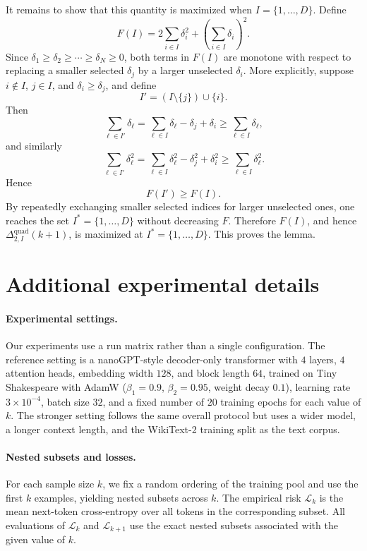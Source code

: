 \documentclass[10pt]{article}
\theoremstyle{plain}
\theoremstyle{remark}
\begin{document}
It remains to show that this quantity is maximized when $I=\{1,\dots,D\}$.
Define
\[
F(I)
=
2\sum_{i\in I}\delta_i^2
+
\left(\sum_{i\in I}\delta_i\right)^2.
\]
Since $\delta_1\ge\delta_2\ge\cdots\ge\delta_N\ge0$, both terms in $F(I)$ are monotone with respect to replacing a smaller selected $\delta_j$ by a larger unselected $\delta_i$.
More explicitly, suppose $i\notin I$, $j\in I$, and $\delta_i\ge \delta_j$, and define
\[
I'=(I\setminus\{j\})\cup\{i\}.
\]
Then
\[
\sum_{\ell\in I'}\delta_\ell
=
\sum_{\ell\in I}\delta_\ell - \delta_j + \delta_i
\ge
\sum_{\ell\in I}\delta_\ell,
\]
and similarly
\[
\sum_{\ell\in I'}\delta_\ell^2
=
\sum_{\ell\in I}\delta_\ell^2 - \delta_j^2 + \delta_i^2
\ge
\sum_{\ell\in I}\delta_\ell^2.
\]
Hence
\[
F(I')\ge F(I).
\]
By repeatedly exchanging smaller selected indices for larger unselected ones, one reaches the set $I^*=\{1,\dots,D\}$ without decreasing $F$.
Therefore $F(I)$, and hence $\Delta_{2,I}^{\mathrm{quad}}(k+1)$, is maximized at $I^*=\{1,\dots,D\}$.
This proves the lemma.

\section{Additional experimental details}
\label{app:exp}

\paragraph{Experimental settings.}
Our experiments use a run matrix rather than a single configuration.
The reference setting is a nanoGPT-style decoder-only transformer with $4$ layers, $4$ attention heads, embedding width $128$, and block length $64$, trained on Tiny Shakespeare with AdamW ($\beta_1=0.9$, $\beta_2=0.95$, weight decay $0.1$), learning rate $3\times 10^{-4}$, batch size $32$, and a fixed number of $20$ training epochs for each value of $k$.
The stronger setting follows the same overall protocol but uses a wider model, a longer context length, and the WikiText-2 training split as the text corpus.

\paragraph{Nested subsets and losses.}
For each sample size $k$, we fix a random ordering of the training pool and use the first $k$ examples, yielding nested subsets across $k$.
The empirical risk $\mathcal L_k$ is the mean next-token cross-entropy over all tokens in the corresponding subset.
All evaluations of $\mathcal L_k$ and $\mathcal L_{k+1}$ use the exact nested subsets associated with the given value of $k$.
\end{document}
